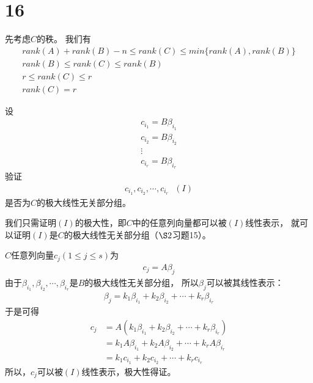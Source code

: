 \documentclass{article}
\begin{document}
\section*{16}

先考虑$C$的秩。
我们有
\begin{align*}
  rank(A) + rank(B) - n \leq rank(C) \leq min\{rank(A), rank(B)\} \\
  rank(B) \leq rank(C) \leq rank(B)                               \\
  r \leq rank(C) \leq r                                           \\
  rank(C) = r
\end{align*}

设
\begin{align*}
  c_{i_1} = B \beta_{i_1} \\
  c_{i_2} = B \beta_{i_2} \\
  \vdots                  \\
  c_{i_r} = B \beta_{i_r}
\end{align*}
验证
\begin{align*}
  c_{i_1}, c_{i_2}, \cdots, c_{i_r} \ \ \ (I)
\end{align*}
是否为$C$的极大线性无关部分组。

我们只需证明$(I)$的极大性，即$C$中的任意列向量都可以被$(I)$线性表示，
就可以证明$(I)$是$C$的极大线性无关部分组（$\S 2$习题15）。

$C$任意列向量$c_j(1 \leq j \leq s)$为
\begin{align*}
  c_j = A \beta_j
\end{align*}
由于$\beta_{i_1}, \beta_{i_2}, \cdots, \beta_{i_r}$是$B$的极大线性无关部分组，
所以$\beta_j$可以被其线性表示：
\begin{align*}
  \beta_j = k_1 \beta_{i_1} + k_2 \beta_{i_2} + \cdots + k_r \beta_{i_r}
\end{align*}
于是可得
\begin{align*}
  c_j & = A(k_1 \beta_{i_1} + k_2 \beta_{i_2} + \cdots + k_r \beta_{i_r})    \\
      & = k_1 A \beta_{i_1} + k_2 A \beta_{i_2} + \cdots + k_r A \beta_{i_r} \\
      & = k_1 c_{i_1} + k_2 c_{i_2} + \cdots + k_r c_{i_r}
\end{align*}
所以，$c_j$可以被$(I)$线性表示，极大性得证。
\end{document}

